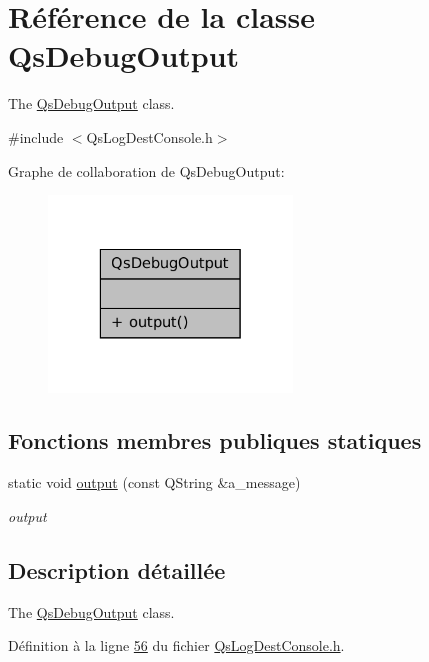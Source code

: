 \hypertarget{classQsDebugOutput}{\section{Référence de la classe Qs\-Debug\-Output}
\label{classQsDebugOutput}
}


The \hyperlink{classQsDebugOutput}{Qs\-Debug\-Output} class.  




{\ttfamily \#include $<$Qs\-Log\-Dest\-Console.\-h$>$}



Graphe de collaboration de Qs\-Debug\-Output\-:
\nopagebreak
\begin{figure}[H]
\begin{center}
\leavevmode
\includegraphics[width=184pt]{classQsDebugOutput__coll__graph}
\end{center}
\end{figure}
\subsection*{Fonctions membres publiques statiques}
\begin{DoxyCompactItemize}
\item 
static void \hyperlink{classQsDebugOutput_a1adecc326b36497c0e6953fae87d1cb1}{output} (const Q\-String \&a\-\_\-message)
\begin{DoxyCompactList}\small\item\em output \end{DoxyCompactList}\end{DoxyCompactItemize}


\subsection{Description détaillée}
The \hyperlink{classQsDebugOutput}{Qs\-Debug\-Output} class. 

Définition à la ligne \hyperlink{QsLogDestConsole_8h_source_l00056}{56} du fichier \hyperlink{QsLogDestConsole_8h_source}{Qs\-Log\-Dest\-Console.\-h}.



